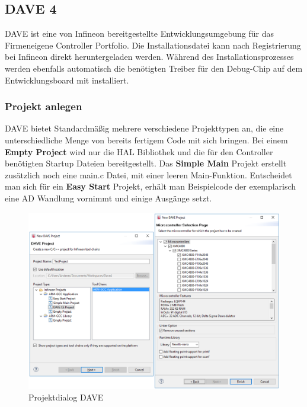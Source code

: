 \subsection{DAVE 4}
DAVE ist eine von Infineon bereitgestellte Entwicklungsumgebung für das Firmeneigene Controller Portfolio. Die Installationsdatei kann nach Registrierung bei Infineon direkt heruntergeladen werden. Während des Installationsprozesses werden ebenfalls automatisch die benötigten Treiber für den Debug-Chip auf dem Entwicklungsboard mit installiert. \\

\subsubsection{Projekt anlegen} 
DAVE bietet Standardm\"a{\ss}ig mehrere verschiedene Projekttypen an, die eine unterschiedliche Menge von bereits fertigem Code mit sich bringen. Bei einem \textbf{Empty Project} wird nur die HAL Bibliothek und die f\"ur den Controller ben\"otigten Startup Dateien bereitgestellt. Das \textbf{Simple Main} Projekt erstellt zus\"atzlich noch eine main.c Datei, mit einer leeren Main-Funktion. Entscheidet man sich für ein \textbf{Easy Start} Projekt, erh\"alt man Beispielcode der exemplarisch eine AD Wandlung vornimmt und einige Ausg\"ange setzt.

\begin{figure}[ht]
\centering
\includegraphics[width=\textwidth]{sensor/dave_project.PNG}
\caption{Projektdialog DAVE}
\label{img:dave_project}
\end{figure}

